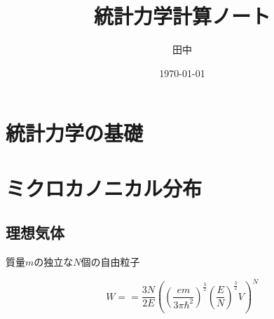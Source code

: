 \documentclass[dvipdfmx, 11pt, a4paper]{jsarticle}
\title{統計力学計算ノート} %
\author{田中}%
\date{\today}  %
\theoremstyle{definition}
\begin{document}
\maketitle %
\tableofcontents %

\maketitle

\newpage
\section{統計力学の基礎}
\newpage
\section{ミクロカノニカル分布}
\subsection{理想気体}
    質量$m$の独立な$N$個の自由粒子
    \begin{definition}[状態数]
        \begin{equation*}
            W = = \frac{3N}{2E} \left( \left( \frac{em}{3 \pi \hbar^2} \right)^{\frac{3}{2}} \left( \frac{E}{N} \right)^{\frac{3}{2}} V \right)^{N}
        \end{equation*}
    \end{definition}
\end{document}
